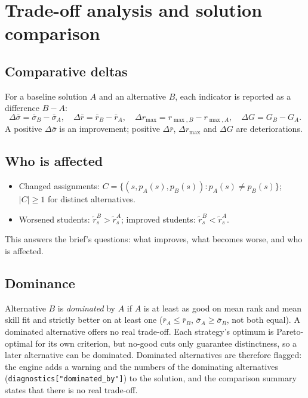 \documentclass[11pt,a4paper]{article}
\newcommand{\code}[1]{\texttt{#1}}
\begin{document}
\section{Trade-off analysis and solution comparison}
\label{sec:tradeoff}

\subsection{Comparative deltas}
For a baseline solution $A$ and an alternative $B$, each indicator is reported
as a difference $B - A$:
\begin{equation*}
  \Delta\bar\sigma = \bar\sigma_B - \bar\sigma_A, \quad
  \Delta\bar r = \bar r_B - \bar r_A, \quad
  \Delta r_{\max} = r_{\max,B} - r_{\max,A}, \quad
  \Delta G = G_B - G_A.
\end{equation*}
A positive $\Delta\bar\sigma$ is an improvement; positive $\Delta\bar r$,
$\Delta r_{\max}$ and $\Delta G$ are deteriorations.

\subsection{Who is affected}
\begin{itemize}
  \item Changed assignments: $C = \{(s, p_A(s), p_B(s)) : p_A(s) \neq p_B(s)\}$;
        $|C| \ge 1$ for distinct alternatives.
  \item Worsened students: $\tilde r^B_s > \tilde r^A_s$; improved students:
        $\tilde r^B_s < \tilde r^A_s$.
\end{itemize}
This answers the brief's questions: what improves, what becomes worse, and who
is affected.

\subsection{Dominance}
Alternative $B$ is \emph{dominated} by $A$ if $A$ is at least as good on mean
rank and mean skill fit and strictly better on at least one
($\bar r_A \le \bar r_B$, $\bar\sigma_A \ge \bar\sigma_B$, not both equal).
A dominated alternative offers no real trade-off. Each strategy's optimum is
Pareto-optimal for its own criterion, but no-good cuts only guarantee
distinctness, so a later alternative can be dominated. Dominated alternatives
are therefore flagged: the engine adds a warning and the numbers of the
dominating alternatives (\code{diagnostics["dominated\_by"]}) to the
solution, and the comparison summary states that there is no real trade-off.
\end{document}
